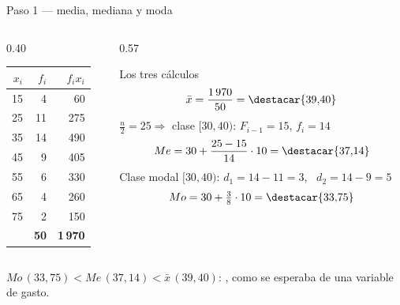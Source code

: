 \documentclass[aspectratio=169,10pt]{beamer}
\begin{document}
\begin{frame}{Paso 1 — media, mediana y moda}
  \scriptsize
  \begin{columns}[T,onlytextwidth]
    \begin{column}{0.40\textwidth}
      \centering
      \begin{tabular}{@{}rrr@{}}
        \toprule
        \textbf{$x_i$} & \textbf{$f_i$} & \textbf{$f_ix_i$} \\
        \midrule
        15 &  4 &   60 \\
        25 & 11 &  275 \\
        35 & 14 &  490 \\
        45 &  9 &  405 \\
        55 &  6 &  330 \\
        65 &  4 &  260 \\
        75 &  2 &  150 \\
        \midrule
        & \textbf{50} & \textbf{1\,970} \\
        \bottomrule
      \end{tabular}
    \end{column}
    \begin{column}{0.57\textwidth}
      \begin{exampleblock}{Los tres cálculos}
        \scriptsize
        \[ \bar{x} = \frac{1\,970}{50} = \destacar{39{,}40} \]
        $\frac{n}{2}=25 \Rightarrow$ clase $[30,40)$: $F_{i-1}=15$, $f_i=14$
        \[ Me = 30 + \frac{25-15}{14}\cdot 10 = \destacar{37{,}14} \]
        Clase modal $[30,40)$: $d_1 = 14-11 = 3$, \ $d_2 = 14-9 = 5$
        \[ Mo = 30 + \tfrac{3}{8}\cdot 10 = \destacar{33{,}75} \]
      \end{exampleblock}
    \end{column}
  \end{columns}

  \vspace{0.05cm}
  {\tiny\color{uniGris} $Mo\,(33{,}75) < Me\,(37{,}14) < \bar{x}\,(39{,}40)$:
  , como se esperaba de una variable de gasto.}
\end{frame}
\end{document}
